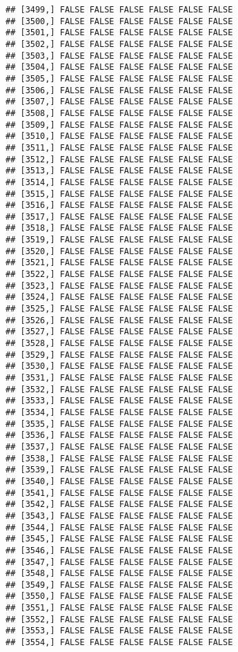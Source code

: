 \documentclass[
]{article}
\begin{document}
\begin{verbatim}
## [3499,] FALSE FALSE FALSE FALSE FALSE FALSE
## [3500,] FALSE FALSE FALSE FALSE FALSE FALSE
## [3501,] FALSE FALSE FALSE FALSE FALSE FALSE
## [3502,] FALSE FALSE FALSE FALSE FALSE FALSE
## [3503,] FALSE FALSE FALSE FALSE FALSE FALSE
## [3504,] FALSE FALSE FALSE FALSE FALSE FALSE
## [3505,] FALSE FALSE FALSE FALSE FALSE FALSE
## [3506,] FALSE FALSE FALSE FALSE FALSE FALSE
## [3507,] FALSE FALSE FALSE FALSE FALSE FALSE
## [3508,] FALSE FALSE FALSE FALSE FALSE FALSE
## [3509,] FALSE FALSE FALSE FALSE FALSE FALSE
## [3510,] FALSE FALSE FALSE FALSE FALSE FALSE
## [3511,] FALSE FALSE FALSE FALSE FALSE FALSE
## [3512,] FALSE FALSE FALSE FALSE FALSE FALSE
## [3513,] FALSE FALSE FALSE FALSE FALSE FALSE
## [3514,] FALSE FALSE FALSE FALSE FALSE FALSE
## [3515,] FALSE FALSE FALSE FALSE FALSE FALSE
## [3516,] FALSE FALSE FALSE FALSE FALSE FALSE
## [3517,] FALSE FALSE FALSE FALSE FALSE FALSE
## [3518,] FALSE FALSE FALSE FALSE FALSE FALSE
## [3519,] FALSE FALSE FALSE FALSE FALSE FALSE
## [3520,] FALSE FALSE FALSE FALSE FALSE FALSE
## [3521,] FALSE FALSE FALSE FALSE FALSE FALSE
## [3522,] FALSE FALSE FALSE FALSE FALSE FALSE
## [3523,] FALSE FALSE FALSE FALSE FALSE FALSE
## [3524,] FALSE FALSE FALSE FALSE FALSE FALSE
## [3525,] FALSE FALSE FALSE FALSE FALSE FALSE
## [3526,] FALSE FALSE FALSE FALSE FALSE FALSE
## [3527,] FALSE FALSE FALSE FALSE FALSE FALSE
## [3528,] FALSE FALSE FALSE FALSE FALSE FALSE
## [3529,] FALSE FALSE FALSE FALSE FALSE FALSE
## [3530,] FALSE FALSE FALSE FALSE FALSE FALSE
## [3531,] FALSE FALSE FALSE FALSE FALSE FALSE
## [3532,] FALSE FALSE FALSE FALSE FALSE FALSE
## [3533,] FALSE FALSE FALSE FALSE FALSE FALSE
## [3534,] FALSE FALSE FALSE FALSE FALSE FALSE
## [3535,] FALSE FALSE FALSE FALSE FALSE FALSE
## [3536,] FALSE FALSE FALSE FALSE FALSE FALSE
## [3537,] FALSE FALSE FALSE FALSE FALSE FALSE
## [3538,] FALSE FALSE FALSE FALSE FALSE FALSE
## [3539,] FALSE FALSE FALSE FALSE FALSE FALSE
## [3540,] FALSE FALSE FALSE FALSE FALSE FALSE
## [3541,] FALSE FALSE FALSE FALSE FALSE FALSE
## [3542,] FALSE FALSE FALSE FALSE FALSE FALSE
## [3543,] FALSE FALSE FALSE FALSE FALSE FALSE
## [3544,] FALSE FALSE FALSE FALSE FALSE FALSE
## [3545,] FALSE FALSE FALSE FALSE FALSE FALSE
## [3546,] FALSE FALSE FALSE FALSE FALSE FALSE
## [3547,] FALSE FALSE FALSE FALSE FALSE FALSE
## [3548,] FALSE FALSE FALSE FALSE FALSE FALSE
## [3549,] FALSE FALSE FALSE FALSE FALSE FALSE
## [3550,] FALSE FALSE FALSE FALSE FALSE FALSE
## [3551,] FALSE FALSE FALSE FALSE FALSE FALSE
## [3552,] FALSE FALSE FALSE FALSE FALSE FALSE
## [3553,] FALSE FALSE FALSE FALSE FALSE FALSE
## [3554,] FALSE FALSE FALSE FALSE FALSE FALSE

\end{verbatim}
\end{document}
